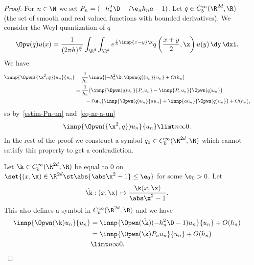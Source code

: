\begin{proof}
For $n \in \N$ we set $P_n = (-h_n^2 \D -i\e_n h_n a - 1)$. Let $q \in C_b^\infty(\R^{2d},\R)$ (the set of smooth and real valued functions with bounded derivatives). We consider the Weyl quantization of $q$
\[
\Opw(q) u (x) = \frac 1 {(2\pi h)^{\frac d 2}} \int_{\R^d} \int_{\R^d} e^{\frac i h \innp{x-y} \x} q\left(\frac {x+y}2,\x \right) u(y) \, \dy \, \dxi.
\]
We have
\begin{align*}
\innp{\Opwn(\{\x^2,q\}) u_n}{u_n} & = \frac 1 {h_n} \innp{[-h_n^2 \D,\Opwn(q)] u_n}{u_n} + O(h_n)\\
& = \frac 1 {h_n} \big(\innp{\Opwn(q) u_n}{P_n u_n} - \innp{P_n u_n}{\Opwn(q) u_n} \big)\\
&\qquad - i \e_n \big(\innp{\Opwn(q)u_n}{au_n} + \innp{a u_n} {\Opwn(q) u_n}\big) + O(h_n),
\end{align*}
so by~\eqref{estim-Pn-un} and~\eqref{eq-nr-a-un}
\begin{equation}\label{eq-poisson-bracket-1}
\innp{\Opwn(\{\x^2,q\}) u_n}{u_n} \limt n \infty 0.
\end{equation}
In the rest of the proof we construct a symbol $q_0 \in C_b^\infty(\R^{2d},\R)$ which cannot satisfy this property to get a contradiction.

Let $\k \in C_b^\infty(\R^{2d},\R)$ be equal to 0 on $\set{(x,\x) \in \R^{2d} \st \abs{\abs \x^2 - 1} \leq \e_0}$ for some $\e_0 > 0$. Let
\[
\tilde \k : (x,\x) \mapsto \frac {\k(x,\x)}{\abs \x^2 - 1}.
\]
This also defines a symbol in $C_b^\infty(\R^{2d},\R)$ and we have
\begin{equation}\label{eq-kappa}
\begin{aligned}
\innp{\Opwn(\k) u_n}{u_n} & = \innp{\Opwn(\tilde \k) (-h_n^2\D - 1) u_n}{u_n} + O(h_n)\\
& = \innp{\Opwn(\tilde \k) P_n u_n}{u_n} + O(h_n)\\
& \limt n \infty 0.
\end{aligned}
\end{equation}


\end{proof}
